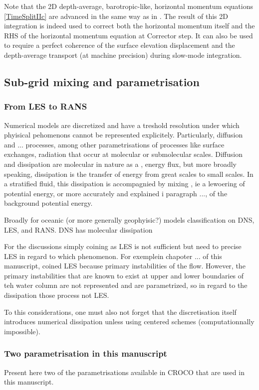 Note that the 2D depth-average, barotropic-like, horizontal momentum equations \ref{TimeSplitIIc} are advanced in the same way as in \cite{shchepetkin_regional_2005}. The result of this 2D integration is indeed used to correct both the horizontal momentum itself and the RHS of the horizontal momentum equation at Corrector step. It can also be used to require a perfect coherence of the surface elevation displacement and the depth-average transport (at machine precision) during slow-mode integration. 

\subsection{Sub-grid mixing and parametrisation}

\subsubsection{From LES to RANS}
Numerical models are discretized and have a treshold resolution under which phyisical pehomenons cannot be represented explicitely. Particularly, diffusion and ... processes,  among other parametrisations of processes like surface exchanges, radiation that occur at molecular or submolecular scales. Diffusion and dissipation are molecular in nature as a , energy flux, but more broadly speaking, dissipation is the transfer of energy from great scales to small scales. In a stratified fluid, this dissipation is accompagnied by mixing , ie a lewoering of potential energy, or more accurately and explained i paragraph ..., of the background potential energy.

Broadly for oceanic (or more generally geophyisic?) models classification on DNS, LES, and RANS. DNS has molecular dissipation


For the discussions simply coining as LES is not sufficient but need to precise LES in regard to which phenomenon. For exemplein chapoter ... of this manuscript, coined LES because primary instabilities of the flow. However, the primary instabilities that are known to exist at upper and lower boundaries of teh water column are not represented and are parametrized, so in regard to the dissipation those process not LES. 



To this considerations, one must also not forget that the discretisation itself introduces numerical dissipation unless using centered schemes (computationnally impossible).

\subsubsection{Two parametrisation in this manuscript}
Present here two of the parametrisations available in CROCO that are used in this manuscript.

